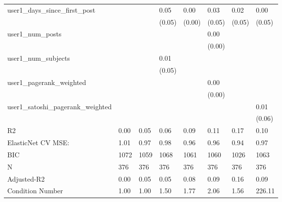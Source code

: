 \begin{table}
\begin{center}
\begin{tabular}{llllllll}
user1_days_since_first_post                    &          &            & 0.05    & 0.00    & 0.03     & 0.02               & 0.00     \\
                                               &          &            & (0.05)  & (0.00)  & (0.05)   & (0.05)             & (0.05)   \\
user1_num_posts                                &          &            &         &         & 0.00     &                    &          \\
                                               &          &            &         &         & (0.00)   &                    &          \\
user1_num_subjects                             &          &            & 0.01    &         &          &                    &          \\
                                               &          &            & (0.05)  &         &          &                    &          \\
user1_pagerank_weighted                        &          &            &         &         & 0.00     &                    &          \\
                                               &          &            &         &         & (0.00)   &                    &          \\
user1_satoshi_pagerank_weighted                &          &            &         &         &          &                    & 0.01     \\
                                               &          &            &         &         &          &                    & (0.06)   \\
R2                                             & 0.00     & 0.05       & 0.06    & 0.09    & 0.11     & 0.17               & 0.10     \\
ElasticNet CV MSE:                             & 1.01     & 0.97       & 0.98    & 0.96    & 0.96     & 0.94               & 0.97     \\
BIC                                            & 1072     & 1059       & 1068    & 1061    & 1060     & 1026               & 1063     \\
N                                              & 376      & 376        & 376     & 376     & 376      & 376                & 376      \\
Adjusted-R2                                    & 0.00     & 0.05       & 0.05    & 0.08    & 0.09     & 0.16               & 0.09     \\
Condition Number                               & 1.00     & 1.00       & 1.50    & 1.77    & 2.06     & 1.56               & 226.11   \\
\hline
\end{tabular}
\end{center}
\end{table}